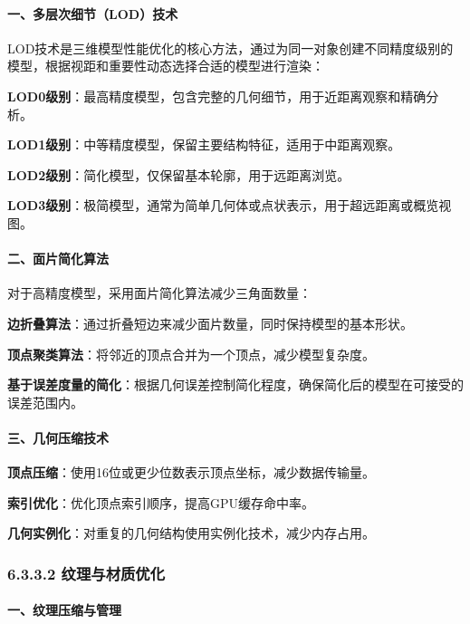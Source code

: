 \paragraph{一、多层次细节（LOD）技术}\label{ux4e00ux591aux5c42ux6b21ux7ec6ux8282lodux6280ux672f}

LOD技术是三维模型性能优化的核心方法，通过为同一对象创建不同精度级别的模型，根据视距和重要性动态选择合适的模型进行渲染：

\textbf{LOD0级别}：最高精度模型，包含完整的几何细节，用于近距离观察和精确分析。

\textbf{LOD1级别}：中等精度模型，保留主要结构特征，适用于中距离观察。

\textbf{LOD2级别}：简化模型，仅保留基本轮廓，用于远距离浏览。

\textbf{LOD3级别}：极简模型，通常为简单几何体或点状表示，用于超远距离或概览视图。

\paragraph{二、面片简化算法}\label{ux4e8cux9762ux7247ux7b80ux5316ux7b97ux6cd5}

对于高精度模型，采用面片简化算法减少三角面数量：

\textbf{边折叠算法}：通过折叠短边来减少面片数量，同时保持模型的基本形状。

\textbf{顶点聚类算法}：将邻近的顶点合并为一个顶点，减少模型复杂度。

\textbf{基于误差度量的简化}：根据几何误差控制简化程度，确保简化后的模型在可接受的误差范围内。

\paragraph{三、几何压缩技术}\label{ux4e09ux51e0ux4f55ux538bux7f29ux6280ux672f}

\textbf{顶点压缩}：使用16位或更少位数表示顶点坐标，减少数据传输量。

\textbf{索引优化}：优化顶点索引顺序，提高GPU缓存命中率。

\textbf{几何实例化}：对重复的几何结构使用实例化技术，减少内存占用。

\subsubsection{6.3.3.2
纹理与材质优化}\label{ux7eb9ux7406ux4e0eux6750ux8d28ux4f18ux5316}

\paragraph{一、纹理压缩与管理}\label{ux4e00ux7eb9ux7406ux538bux7f29ux4e0eux7ba1ux7406}

